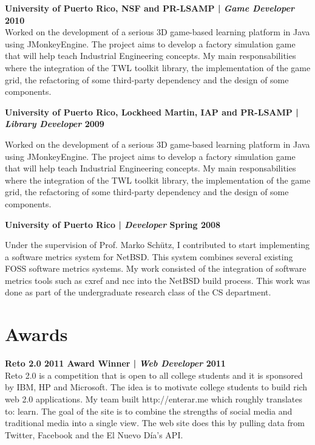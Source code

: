 \documentclass[margin,line]{res}
\begin{document}
\begin{resume}
{\bf University of Puerto Rico, NSF and PR-LSAMP | {\em Game Developer} \hfill {\bf 2010 \\} }
\vspace{-.01cm}
Worked on the development of a serious 3D game-based learning platform in Java using JMonkeyEngine. The project aims to develop a factory simulation game that will help teach Industrial Engineering concepts. My main responsabilities where the integration of the TWL toolkit library, the implementation of the game grid, the refactoring of some third-party dependency and the design of some components.

\clearpage

{\bf University of Puerto Rico, Lockheed Martin, IAP and PR-LSAMP | {\em Library Developer} \hfill {\bf 2009 \\} }
\vspace{-.01cm}

Worked on the development of a serious 3D game-based learning platform in Java using JMonkeyEngine. The project aims to develop a factory simulation game that will help teach Industrial Engineering concepts. My main responsabilities where the integration of the TWL toolkit library, the implementation of the game grid, the refactoring of some third-party dependency and the design of some components.

{\bf University of Puerto Rico | {\em Developer} \hfill {\bf Spring 2008 \\} }
\vspace{-.01cm}

Under the supervision of Prof. Marko Schütz, I contributed to start implementing a software metrics system for NetBSD. This system combines several existing FOSS software metrics systems. My work consisted of the integration of software metrics tools such as cxref and ncc into the NetBSD build process. This work was done as part of the undergraduate research class of the CS department.

\section{\sc Awards}

{\bf Reto 2.0 2011 Award Winner | {\em Web Developer} \hfill {\bf 2011 \\} }
\vspace{-.01cm}
Reto 2.0 is a competition that is open to all college students and it is sponsored by IBM, HP and Microsoft. The idea is to motivate college students to build rich web 2.0 applications. My team built http://enterar.me which roughly translates to: learn. The goal of the site is to combine the strengths of social media and traditional media into a single view. The web site does this by pulling data from Twitter, Facebook and the El Nuevo Día's API.


\end{resume}
\end{document}
